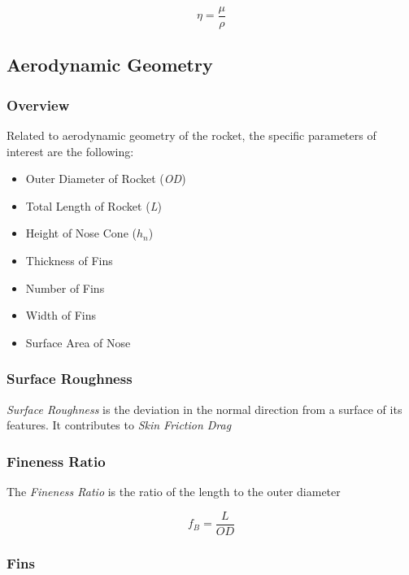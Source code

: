 \documentclass[]{article}
\providecommand{\tightlist}{%
  \setlength{\itemsep}{0pt}\setlength{\parskip}{0pt}}
\begin{document}
\begin{equation}
\eta = \dfrac{\mu}{\rho}
\end{equation}

\subsection{Aerodynamic Geometry}\label{aerodynamic-geometry}

\subsubsection{Overview}\label{overview-1}

Related to aerodynamic geometry of the rocket, the specific parameters
of interest are the following:

\begin{itemize}
\tightlist
\item
  Outer Diameter of Rocket (\emph{OD})
\item
  Total Length of Rocket (\emph{L})
\item
  Height of Nose Cone (\(h_n\))
\item
  Thickness of Fins
\item
  Number of Fins
\item
  Width of Fins
\item
  Surface Area of Nose
\end{itemize}

\subsubsection{Surface Roughness}\label{surface-roughness}

\emph{Surface Roughness} is the deviation in the normal direction from a
surface of its features. It contributes to \emph{Skin Friction Drag}

\subsubsection{Fineness Ratio}\label{fineness-ratio}

The \emph{Fineness Ratio} is the ratio of the length to the outer
diameter

\begin{equation} 
f_B = \dfrac{L} {OD}
\end{equation}

\subsubsection{Fins}\label{fins-1}
\end{document}

